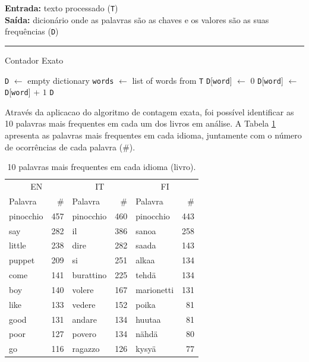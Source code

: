 \documentclass[mirror, portugues]{revdetua}
\begin{document}
\begin{algorithm}[H]
\raggedright
\textbf{Entrada:} texto processado (\texttt{T}) \\
\textbf{Saída:} dicionário onde as palavras são as chaves e os valores são as suas frequências (\texttt{D})\\
\hrule 
\caption{Contador Exato}
\begin{algorithmic}[1]
    \State \texttt{D} $\gets$ empty dictionary
    \State \texttt{words} $\gets$ list of words from \texttt{T}
            \State \texttt{D}[\texttt{word}] $\gets$ 0
        \EndIf
        \State \texttt{D}[\texttt{word}] $\gets$ \texttt{D}[\texttt{word}] + $1$
    \EndFor
    \State \Return \texttt{D}
\end{algorithmic}
\end{algorithm}

Através da aplicacao do algoritmo de contagem exata, foi possível identificar as 10 palavras mais frequentes em cada um dos livros em análise. A Tabela \ref{table:top10_exatos} apresenta as palavras mais frequentes em cada idioma, juntamente com o número de ocorrências de cada palavra (\#).

\begin{table}[H]
\centering
\caption{10 palavras mais frequentes em cada idioma (livro).}
\label{table:top10_exatos}
\begin{tabular}{lr|lr|lr}
\toprule
\multicolumn{2}{c}{EN} & \multicolumn{2}{c}{IT} & \multicolumn{2}{c}{FI} \\
Palavra & \# & Palavra & \# & Palavra & \# \\
\midrule
pinocchio & 457 & pinocchio & 460 & pinocchio & 443 \\
say & 282 & il & 386 & sanoa & 258 \\
little & 238 & dire & 282 & saada & 143 \\
puppet & 209 & si & 251 & alkaa & 134 \\
come & 141 & burattino & 225 & tehdä & 134 \\
boy & 140 & volere & 167 & marionetti & 131 \\
like & 133 & vedere & 152 & poika & 81 \\
good & 131 & andare & 134 & huutaa & 81 \\
poor & 127 & povero & 134 & nähdä & 80 \\
go & 116 & ragazzo & 126 & kysyä & 77 \\
\bottomrule
\end{tabular}
\end{table}
\end{document}
